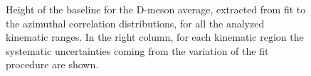 \begin{figure}
\centering
\caption{Height of the baseline for the D-meson average, extracted from fit to the azimuthal correlation distributions, for all the analyzed kinematic ranges. In the right column, for each kinematic region the systematic uncertainties coming from the variation of the fit procedure are shown.}
\label{fig:baselineAverage}
\end{figure}

